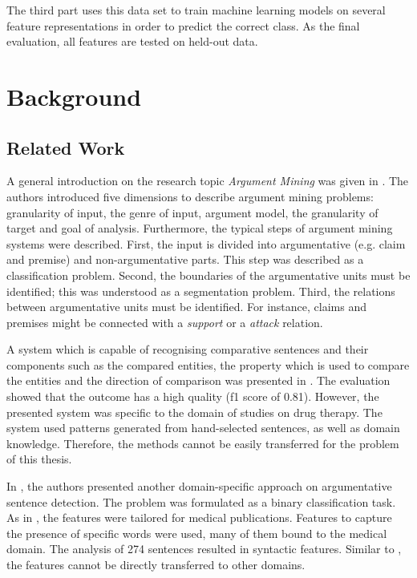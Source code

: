 The third part uses this data set to train machine learning models on several feature representations in order to predict the correct class. As the final evaluation, all features are tested on held-out data.

\chapter{Background}
\section{Related Work}
\label{sec:argth}
\label{sec:argmine}
A general introduction on the research topic \emph{Argument Mining} was given in \cite{Lippi2016Argumentation-M}.
The authors introduced five dimensions to describe argument mining problems: granularity of input, the genre of input, argument model, the granularity of target and goal of analysis.  Furthermore, the typical steps of argument mining systems were described. First, the input is divided into argumentative (e.g. claim and premise) and non-argumentative parts. This step was described as a classification problem. Second, the boundaries of the argumentative units must be identified; this was understood as a segmentation problem. Third, the relations between argumentative units must be identified. For instance, claims and premises might be connected with a \emph{support} or a \emph{attack} relation.




A system which is capable of recognising comparative sentences and their components such as the compared entities, the property which is used to compare the entities and the direction of comparison was presented in \cite{fiszman2007interpreting}. The evaluation showed that the outcome has a high quality (f1 score of 0.81). However, the presented system was specific to the domain of studies on drug therapy. The system used patterns generated from hand-selected sentences, as well as domain knowledge. Therefore, the methods cannot be easily  transferred for the problem of this thesis.

In \cite{park2012identifying}, the authors presented another domain-specific approach on argumentative sentence detection. The problem was formulated as a binary classification task. As in \cite{fiszman2007interpreting}, the features were tailored for medical publications. Features to capture the presence of specific words were used, many of them bound to the medical domain. The analysis of 274 sentences resulted in syntactic features. Similar to \cite{fiszman2007interpreting}, the features cannot be directly transferred to other domains.

